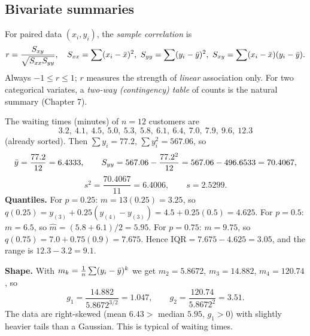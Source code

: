 \begin{center}
\end{center}

\subsection{Bivariate summaries}

For paired data $(x_i,y_i)$, the \emph{sample correlation} is
\[
r = \frac{S_{xy}}{\sqrt{S_{xx}S_{yy}}},\quad
S_{xx}=\sum(x_i-\bar x)^2,\ S_{yy}=\sum(y_i-\bar{y})^2,\ S_{xy}=\sum (x_i-\bar x)(y_i-\bar{y}).
\]
Always $-1\le r\le 1$; $r$ measures the strength of \emph{linear} association only. For two
categorical variates, a \emph{two-way (contingency) table} of counts is the natural summary
(Chapter 7).

\begin{example}
\label{ex:summ}
The waiting times (minutes) of $n=12$ customers are
\[
3.2,\ 4.1,\ 4.5,\ 5.0,\ 5.3,\ 5.8,\ 6.1,\ 6.4,\ 7.0,\ 7.9,\ 9.6,\ 12.3
\]
(already sorted). Then $\sum y_i = 77.2$, $\sum y_i^2 = 567.06$, so
\[
\bar{y} = \frac{77.2}{12} = 6.4333,\qquad
S_{yy} = 567.06 - \frac{77.2^2}{12} = 567.06 - 496.6533 = 70.4067,
\]
\[
s^2 = \frac{70.4067}{11} = 6.4006,\qquad s = 2.5299.
\]
\textbf{Quantiles.} For $p=0.25$: $m = 13(0.25) = 3.25$, so
$q(0.25) = y_{(3)} + 0.25(y_{(4)}-y_{(3)}) = 4.5 + 0.25(0.5) = 4.625$.
For $p=0.5$: $m=6.5$, so $\hat m = (5.8+6.1)/2 = 5.95$.
For $p=0.75$: $m = 9.75$, so $q(0.75) = 7.0 + 0.75(0.9) = 7.675$.
Hence $\mathrm{IQR} = 7.675 - 4.625 = 3.05$, and the range is $12.3 - 3.2 = 9.1$.

\textbf{Shape.} With $m_k = \frac1n\sum (y_i-\bar{y})^k$ we get $m_2 = 5.8672$,
$m_3 = 14.882$, $m_4 = 120.74$, so
\[
g_1 = \frac{14.882}{5.8672^{3/2}} = 1.047, \qquad g_2 = \frac{120.74}{5.8672^2} = 3.51.
\]
The data are right-skewed (mean $6.43 >$ median $5.95$, $g_1>0$) with slightly heavier
tails than a Gaussian. This is typical of waiting times.
\end{example}

